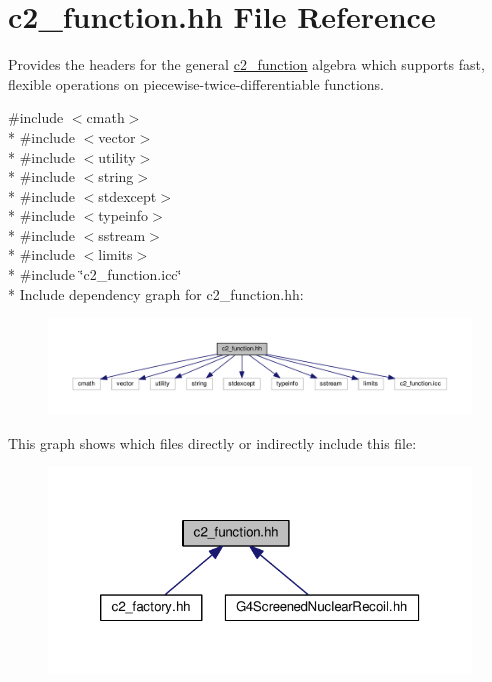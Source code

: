 \hypertarget{c2__function_8hh}{}\section{c2\+\_\+function.\+hh File Reference}
\label{c2__function_8hh}


Provides the headers for the general \hyperlink{classc2__function}{c2\+\_\+function} algebra which supports fast, flexible operations on piecewise-\/twice-\/differentiable functions.  


{\ttfamily \#include $<$cmath$>$}\\*
{\ttfamily \#include $<$vector$>$}\\*
{\ttfamily \#include $<$utility$>$}\\*
{\ttfamily \#include $<$string$>$}\\*
{\ttfamily \#include $<$stdexcept$>$}\\*
{\ttfamily \#include $<$typeinfo$>$}\\*
{\ttfamily \#include $<$sstream$>$}\\*
{\ttfamily \#include $<$limits$>$}\\*
{\ttfamily \#include \char`\"{}c2\+\_\+function.\+icc\char`\"{}}\\*
Include dependency graph for c2\+\_\+function.\+hh\+:
\nopagebreak
\begin{figure}[H]
\begin{center}
\leavevmode
\includegraphics[width=350pt]{c2__function_8hh__incl}
\end{center}
\end{figure}
This graph shows which files directly or indirectly include this file\+:
\nopagebreak
\begin{figure}[H]
\begin{center}
\leavevmode
\includegraphics[width=320pt]{c2__function_8hh__dep__incl}
\end{center}
\end{figure}
